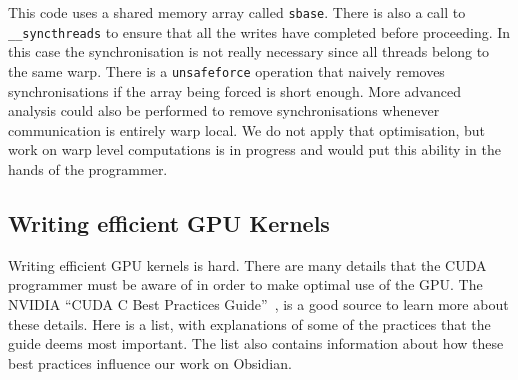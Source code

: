 \documentclass[a4paper]{book}
\begin{document}
\noindent This code uses a shared memory array called {\tt sbase}. There 
is also a call to {\tt \_\_syncthreads} to ensure that all the writes have 
completed before proceeding. In this case the synchronisation is not really
necessary since all threads belong to the same warp. There is a {\tt unsafeforce} 
operation that naively removes synchronisations if the array being forced is short 
enough. More advanced analysis could also be performed to remove synchronisations 
whenever communication is entirely warp local. We do not apply that optimisation, 
but work on warp level computations is in progress and would put this ability 
in the hands of the programmer.  

\FloatBarrier 
\subsection{Writing efficient GPU Kernels} 
\label{sec:efficient}
 
Writing efficient GPU kernels is hard. There are many details that the CUDA 
programmer must be aware of in order to make optimal use of the GPU. 
The NVIDIA ``CUDA C Best Practices Guide''~\citet{BestPrac}, is a good source 
to learn more about these details. Here is a list, with explanations of some 
of the practices that the guide deems most important. The list also contains 
information about how these best practices influence our work on Obsidian.  
  
\end{document}
